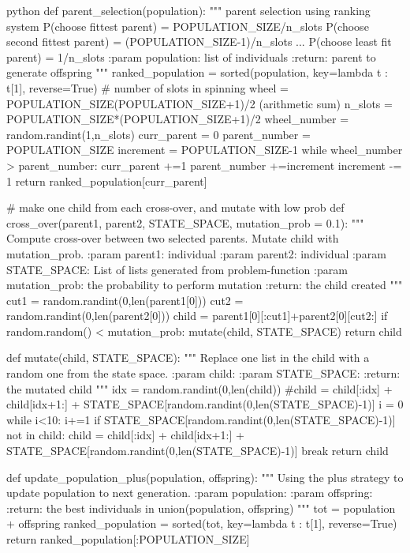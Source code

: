 \begin{mintedbox}{python}
def parent_selection(population):
    """
    parent selection using ranking system
    P(choose fittest parent) = POPULATION_SIZE/n_slots
    P(choose second fittest parent) = (POPULATION_SIZE-1)/n_slots
    ...
    P(choose least fit parent) = 1/n_slots
    :param population: list of individuals
    :return: parent to generate offspring
    """
    ranked_population = sorted(population, key=lambda t : t[1], reverse=True)
    # number of slots in spinning wheel = POPULATION_SIZE(POPULATION_SIZE+1)/2 (arithmetic sum)
    n_slots = POPULATION_SIZE*(POPULATION_SIZE+1)/2
    wheel_number = random.randint(1,n_slots)
    curr_parent = 0
    parent_number = POPULATION_SIZE
    increment = POPULATION_SIZE-1
    while wheel_number > parent_number:
        curr_parent +=1
        parent_number +=increment
        increment -= 1
    return ranked_population[curr_parent]

# make one child from each cross-over, and mutate with low prob
def cross_over(parent1, parent2, STATE_SPACE, mutation_prob = 0.1):
    """
    Compute cross-over between two selected parents. Mutate child with mutation_prob.
    :param parent1: individual
    :param parent2: individual
    :param STATE_SPACE: List of lists generated from problem-function
    :param mutation_prob: the probability to perform mutation
    :return: the child created
    """
    cut1 = random.randint(0,len(parent1[0]))
    cut2 = random.randint(0,len(parent2[0]))
    child = parent1[0][:cut1]+parent2[0][cut2:]
    if random.random() < mutation_prob:
        mutate(child, STATE_SPACE)
    return child


def mutate(child, STATE_SPACE):
    """
    Replace one list in the child with a random one from the state space.
    :param child:
    :param STATE_SPACE:
    :return: the mutated child
    """
    idx = random.randint(0,len(child))
    #child = child[:idx] + child[idx+1:] + STATE_SPACE[random.randint(0,len(STATE_SPACE)-1)]
    i = 0
    while i<10:
        i+=1
        if STATE_SPACE[random.randint(0,len(STATE_SPACE)-1)] not in child:
             child = child[:idx] + child[idx+1:] + STATE_SPACE[random.randint(0,len(STATE_SPACE)-1)]
             break
    return child

def update_population_plus(population, offspring):
    """
    Using the plus strategy to update population to next generation.
    :param population:
    :param offspring:
    :return: the best individuals in union(population, offspring)
    """
    tot = population + offspring
    ranked_population = sorted(tot, key=lambda t : t[1], reverse=True)
    return ranked_population[:POPULATION_SIZE]


\end{mintedbox}
